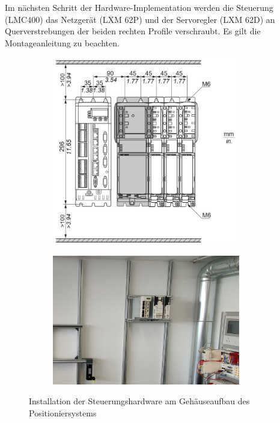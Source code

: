 \documentclass[../../../Bachelorarbeit.tex]{subfiles}
\begin{document}
Im nächsten Schritt der Hardware-Implementation werden die Steuerung (LMC400) das Netzgerät (LXM 62P) und der Servoregler (LXM 62D) an Querverstrebungen der beiden rechten Profile verschraubt. Es gilt die Montageanleitung zu beachten.

\begin{figure}[H]
    \centering
    \begin{subfigure}[c]{0.42\textwidth}
        \centering
        \includegraphics[width=0.9\textwidth]{Images/Steuerungshardwareinstallation.jpg}
    \end{subfigure}
    \begin{subfigure}[c]{0.42\textwidth}
        \centering
        \includegraphics[width=0.9\textwidth]{Images/Steuerungshardware.jpg}
    \end{subfigure}
    \caption[Steuerungsinstallation]{Installation der Steuerungshardware am Gehäuseaufbau des Positioniersystems}
    \label{fig:my-img21}
\end{figure}
\end{document}
